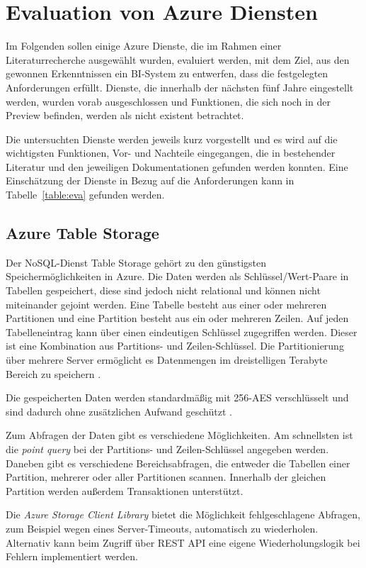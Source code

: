 \section{Evaluation von Azure Diensten} \label{sec:evaluation}
Im Folgenden sollen einige Azure Dienste, die im Rahmen einer Literaturrecherche ausgewählt wurden, evaluiert werden, mit dem Ziel, aus den gewonnen Erkenntnissen ein BI-System zu entwerfen, dass die festgelegten Anforderungen erfüllt. Dienste, die innerhalb der nächsten fünf Jahre eingestellt werden, wurden vorab ausgeschlossen und Funktionen, die sich noch in der Preview befinden, werden als nicht existent betrachtet. 

Die untersuchten Dienste werden jeweils kurz vorgestellt und es wird auf die wichtigsten Funktionen, Vor- und Nachteile eingegangen, die in bestehender Literatur und den jeweiligen Dokumentationen gefunden werden konnten. Eine Einschätzung der Dienste in Bezug auf die Anforderungen kann in Tabelle~\ref{table:eva} gefunden werden.

\subsection{Azure Table Storage} \label{sec:grundlagen:azure_dienste:tableStorage}
Der NoSQL-Dienst Table Storage gehört zu den günstigsten Speichermöglichkeiten in Azure. Die Daten werden als Schlüssel/Wert-Paare in Tabellen gespeichert, diese sind jedoch nicht relational und können nicht miteinander gejoint werden. Eine Tabelle besteht aus einer oder mehreren Partitionen und eine Partition besteht aus ein oder mehreren Zeilen. Auf jeden Tabelleneintrag kann über einen eindeutigen Schlüssel zugegriffen werden. Dieser ist eine Kombination aus Partitions- und Zeilen-Schlüssel. Die Partitionierung über mehrere Server ermöglicht es Datenmengen im dreistelligen Terabyte Bereich zu speichern \cite{reagan_web_2018}.

Die gespeicherten Daten werden standardmäßig mit 256-AES verschlüsselt und sind dadurch ohne zusätzlichen Aufwand geschützt \cite{soh_microsoft_2020}. 

Zum Abfragen der Daten gibt es verschiedene Möglichkeiten. Am schnellsten ist die \textit{point query} bei der Partitions- und Zeilen-Schlüssel angegeben werden. Daneben gibt es verschiedene Bereichsabfragen, die entweder die Tabellen einer Partition, mehrerer oder aller Partitionen scannen. Innerhalb der gleichen Partition werden außerdem Transaktionen unterstützt.

Die \textit{Azure Storage Client Library} bietet die Möglichkeit fehlgeschlagene Abfragen, zum Beispiel wegen eines Server-Timeouts, automatisch zu wiederholen. Alternativ kann beim Zugriff über REST API eine eigene Wiederholungslogik bei Fehlern implementiert werden.

